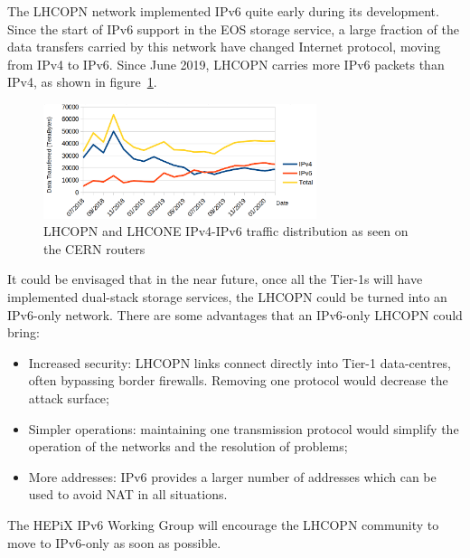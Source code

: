 
The LHCOPN network implemented IPv6 quite early during its development. 
Since the start of IPv6 support in the EOS storage service, a large fraction of the data transfers carried by this network have changed Internet protocol, moving from IPv4 to IPv6. Since June 2019, LHCOPN carries more IPv6 packets than IPv4, as shown in figure~\ref{fig:lhcopne-traffic}.

\begin{figure}[h]
\centering
\includegraphics[width=8cm]{lhcopne-traffic.png}
\caption{LHCOPN and LHCONE IPv4-IPv6 traffic distribution as seen on the CERN routers\cite{RefLHCOPNEv4v6}  }
\label{fig:lhcopne-traffic}
\end{figure}


It could be envisaged that in the near future, once all the Tier-1s will have implemented dual-stack storage services, the LHCOPN could be turned into an IPv6-only network. There are some advantages that an IPv6-only LHCOPN could bring:
\begin{itemize}
  \item Increased security: LHCOPN links connect directly into Tier-1 data-centres, often bypassing border firewalls. Removing one protocol would decrease the attack surface;
  \item Simpler operations: maintaining one transmission protocol would simplify the operation of the networks and the resolution of problems;
  \item More addresses: IPv6 provides a larger number of addresses which can be used to avoid NAT in all situations.
\end{itemize}

The HEPiX IPv6 Working Group will encourage the LHCOPN community to move to IPv6-only as soon as possible.




